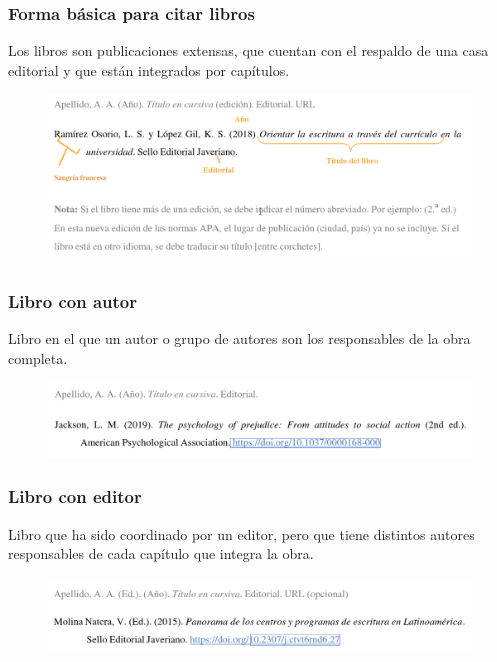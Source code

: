 \documentclass[
11pt, %
]{beamer}
\begin{document}
\begin{frame}
	\frametitle{Forma básica para citar libros}

	Los libros son publicaciones extensas, que cuentan con el respaldo de una casa editorial y
	que están integrados por capítulos.

	\begin{exampleblock}{}
		\begin{figure}
			\centering
			\includegraphics[width=1\linewidth]{images/screenshot010}
			\label{fig:screenshot010}
		\end{figure}
	\end{exampleblock}

\end{frame}

\begin{frame}
	\frametitle{Libro con autor}

	Libro en el que un autor o grupo de autores son los responsables de la obra completa.

	\begin{exampleblock}{}
		\begin{figure}
			\centering
			\includegraphics[width=1\linewidth]{images/screenshot011}
			\label{fig:screenshot010}
		\end{figure}
	\end{exampleblock}

\end{frame}

\begin{frame}
	\frametitle{Libro con editor}

	Libro que ha sido coordinado por un editor, pero que tiene distintos autores responsables de
	cada capítulo que integra la obra.

	\begin{exampleblock}{}
		\begin{figure}
			\centering
			\includegraphics[width=1\linewidth]{images/screenshot012}
			\label{fig:screenshot010}
		\end{figure}
	\end{exampleblock}

\end{frame}
\end{document}
